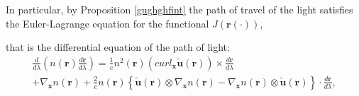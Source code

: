 \documentclass{article}
\theoremstyle{definition}
\theoremstyle{remark}
\renewcommand{\vec}[1]{\mathbf{#1}}
\newcommand{\er}{\eqref}
\newcommand{\er}{\eqref}
\begin{document}
In particular, by Proposition \ref{gughghfint} the path of travel of
the light satisfies the Euler-Lagrange equation for the functional
$J\left(\vec r(\cdot)\right)$,
%
%
%
\begin{comment}
\begin{multline}\label{MaxMedFullGGffgggyyojjhhjkhjyyiuhggjhhjhuyytytyuuytrrtghjtyuggyuighjuyioyyfgffhyuhhghzzrrkkhhkkkhhhjhkjhhghhgghiuiu2int}
\frac{d}{ds}\left(n\left(\vec r(s)\right)\frac{1}{\left|\vec
r'(s)\right|}\vec r'(s)-\frac{1}{c}n^2\left(\vec r(s)\right)\vec
{\tilde u}\left(\vec r(s)\right)\right)=\\
\left|\vec r'(s)\right|\nabla_{\vec x}n\left(\vec
r(s)\right)-\frac{2}{c}\left(\vec {\tilde u}\left(\vec
r(s)\right)\cdot\vec r'(s)\right)n\left(\vec r(s)\right)\nabla_{\vec
x}n\left(\vec r(s)\right)-\frac{1}{c}n^2\left(\vec
r(s)\right)\left\{d_{\vec x}\vec {\tilde u}\left(\vec
r(s)\right)\right\}^T\cdot\vec r'(s),
\end{multline}
that we rewrite as:
\begin{multline}\label{MaxMedFullGGffgggyyojjhhjkhjyyiuhggjhhjhuyytytyuuytrrtghjtyuggyuighjuyioyyfgffhyuhhghzzrrkkhhkkkhhhjhkjhhghhgghiuiuhhjhj1int}
\frac{1}{\left|\vec r'(s)\right|}\frac{d}{ds}\left(n\left(\vec
r(s)\right)\frac{1}{\left|\vec r'(s)\right|}\vec r'(s)\right)=\\
\nabla_{\vec x}n\left(\vec r(s)\right)+\frac{1}{c}n^2\left(\vec
r(s)\right)\left(d_{\vec x}\vec {\tilde u}\left(\vec
r(s)\right)-\left\{d_{\vec x}\vec {\tilde u}\left(\vec
r(s)\right)\right\}^T\right)\cdot\left(\frac{1}{\left|\vec
r'(s)\right|}\vec r'(s)\right)\\
+\frac{2}{c}n\left(\vec r(s)\right)\left\{\vec {\tilde u}\left(\vec
r(s)\right)\otimes\nabla_{\vec x}n\left(\vec
r(s)\right)-\nabla_{\vec x}n\left(\vec r(s)\right)\otimes\vec
{\tilde u}\left(\vec
r(s)\right)\right\}\cdot\left(\frac{1}{\left|\vec r'(s)\right|}\vec
r'(s)\right).
\end{multline}
Therefor by \er{apfrm9} and
\er{MaxMedFullGGffgggyyojjhhjkhjyyiuhggjhhjhuyytytyuuytrrtghjtyuggyuighjuyioyyfgffhyuhhghzzrrkkhhkkkhhhjhkjhhghhgghiuiuhhjhj1int}
we deduce
\end{comment}
%
%
%
that is the differential equation of the path of light:
\begin{multline}\label{MaxMedFullGGffgggyyojjhhjkhjyyiuhggjhhjhuyytytyuuytrrtghjtyuggyuighjuyioyyfgffhyuhhghzzrrkkhhkkkhhhjhkjhhghhgghiuiuhhjhjint}
\frac{d}{d\lambda}\left(n\left(\vec r\right)\frac{d\vec
r}{d\lambda}\right)=\frac{1}{c}n^2\left(\vec
r\right)\left(curl_{\vec x}\vec {\tilde u}\left(\vec
r\right)\right)\times\frac{d\vec r}{d\lambda}\\ +\nabla_{\vec
x}n\left(\vec r\right) +\frac{2}{c}n\left(\vec r\right)\left\{\vec
{\tilde u}\left(\vec r\right)\otimes\nabla_{\vec x}n\left(\vec
r\right)-\nabla_{\vec x}n\left(\vec r\right)\otimes\vec {\tilde
u}\left(\vec r\right)\right\}\cdot\frac{d\vec r}{d\lambda},
\end{multline}
\end{document}
